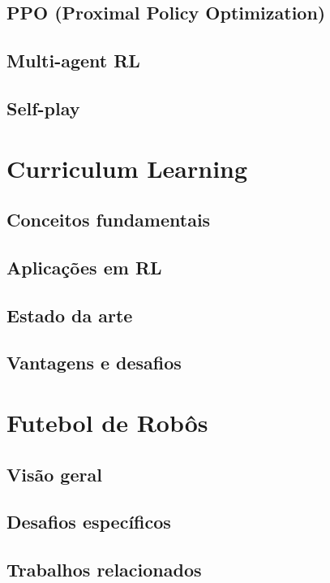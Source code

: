 \subsection{PPO (Proximal Policy Optimization)}
\label{subsec:ppo}

\subsection{Multi-agent RL}
\label{subsec:marl}

\subsection{Self-play}
\label{subsec:self_play}

\section{Curriculum Learning}
\label{sec:curriculum}

\subsection{Conceitos fundamentais}
\label{subsec:curriculum_conceitos}

\subsection{Aplicações em RL}
\label{subsec:curriculum_rl}

\subsection{Estado da arte}
\label{subsec:curriculum_estado_arte}

\subsection{Vantagens e desafios}
\label{subsec:curriculum_vantagens_desafios}

\section{Futebol de Robôs}
\label{sec:futebol_robos}

\subsection{Visão geral}
\label{subsec:futebol_visao}

\subsection{Desafios específicos}
\label{subsec:futebol_desafios}

\subsection{Trabalhos relacionados}
\label{subsec:futebol_trabalhos}